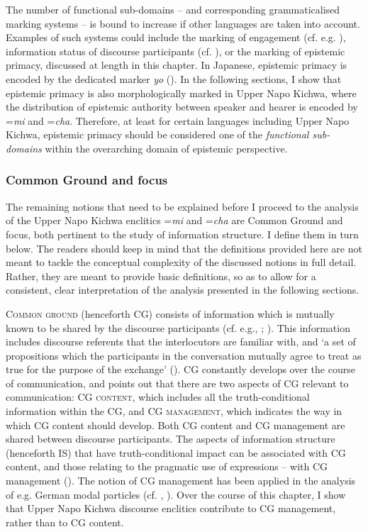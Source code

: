 \documentclass[output=paper]{langscibook}
\begin{document}
The number of functional sub-domains – and corresponding grammaticalised marking systems – is bound to increase if other languages are taken into account. Examples of such systems could include the marking of engagement (cf. e.g. \citealt{Landaburu2007}), information status of discourse participants (cf. \citealt{SanRoque2008}), or the marking of epistemic primacy, discussed at length in this chapter. In Japanese, epistemic primacy is encoded by the dedicated marker \textit{yo} (\citealt{Hayano2011}). In the following sections, I show that epistemic primacy is also morphologically marked in Upper Napo Kichwa, where the distribution of epistemic authority between speaker and hearer is encoded by =\textit{mi} and =\textit{cha}. Therefore, at least for certain languages including Upper Napo Kichwa, epistemic primacy should be considered one of the \emph{functional sub-domains} within the overarching domain of epistemic perspective.


\subsubsection{Common Ground and focus}\label{s:kg1-3-4}

The remaining notions that need to be explained before I proceed to the analysis of the Upper Napo Kichwa enclitics =\textit{mi} and =\textit{cha} are Common Ground and focus, both pertinent to the study of information structure. I define them in turn below. The readers should keep in mind that the definitions provided here are not meant to tackle the conceptual complexity of the discussed notions in full detail. Rather, they are meant to provide basic definitions, so as to allow for a consistent, clear interpretation of the analysis presented in the following sections.

\textsc{Common ground} (henceforth CG) consists of information which is mutually known to be shared by the discourse participants (cf. e.g., \citealt{Stalnaker1974}; \citealt{Clark1996}). This information includes discourse referents that the interlocutors are familiar with, and ‘a set of propositions which the participants in the conversation mutually agree to treat as true for the purpose of the exchange’ (\citealt{Stalnaker1978}). CG constantly develops over the course of communication, and \cite{Krifka2007} points out that there are two aspects of CG relevant to communication: CG \textsc{content}, which includes all the truth-conditional information within the CG, and CG \textsc{management}, which indicates the way in which CG content should develop. Both CG content and CG management are shared between discourse participants. The aspects of information structure (henceforth IS) that have truth-conditional impact can be associated with CG content, and those relating to the pragmatic use of expressions – with CG management (\citealt[18]{Krifka2007}). The notion of CG management has been applied in the analysis of e.g. German modal particles (cf. \citealt{Repp2013}, \citealt{Döring2016}). Over the course of this chapter, I show that Upper Napo Kichwa discourse enclitics contribute to CG management, rather than to CG content.
\end{document}
